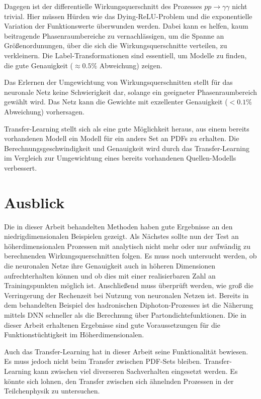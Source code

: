 Dagegen ist der differentielle Wirkungsquerschnitt des Prozesses $pp \rightarrow \gamma \gamma$ nicht trivial. Hier müssen Hürden wie das Dying-ReLU-Problem und die exponentielle Variation der Funktionswerte überwunden werden. Dabei kann es helfen, kaum beitragende Phasenraumbereiche zu vernachlässigen, um die Spanne an Größenordunungen, über die sich die Wirkungsquerschnitte verteilen, zu verkleinern. Die Label-Transformationen sind essentiell, um Modelle zu finden, die gute Genauigkeit ($\approx 0.5\%$ Abweichung) zeigen.

Das Erlernen der Umgewichtung von Wirkungsquerschnitten stellt für das neuronale Netz keine Schwierigkeit dar, solange ein geeigneter Phasenraumbereich gewählt wird. Das Netz kann die Gewichte mit exzellenter Genauigkeit ($<0.1\%$ Abweichung) vorhersagen.

Transfer-Learning stellt sich als eine gute Möglichkeit heraus, aus einem bereits vorhandenen Modell ein Modell für ein anders Set an PDFs zu erhalten. Die Berechnungsgeschwindigkeit und Genauigkeit wird durch das Transfer-Learning im Vergleich zur Umgewichtung eines bereits vorhandenen Quellen-Modells verbessert.

\section{Ausblick}
Die in dieser Arbeit behandelten Methoden haben gute Ergebnisse an den niedrigdimensionalen Beispielen gezeigt. Als Nächstes sollte nun der Test an höherdimensionalen Prozessen mit analytisch nicht mehr oder nur aufwändig zu berechnenden Wirkungsquerschnitten folgen. Es muss noch untersucht werden, ob die neuronalen Netze ihre Genauigkeit auch in höheren Dimensionen aufrechterhalten können und ob dies mit einer realisierbaren Zahl an Trainingspunkten möglich ist. Anschließend muss überprüft werden, wie groß die Verringerung der Rechenzeit bei Nutzung von neuronalen Netzen ist. Bereits in dem behandelten Beispiel des hadronischen Diphoton-Prozesses ist die Näherung mittels DNN schneller als die Berechnung über Partondichtefunktionen. Die in dieser Arbeit erhaltenen Ergebnisse sind gute Voraussetzungen für die Funktionstüchtigkeit im Höherdimensionalen.

Auch das Transfer-Learning hat in dieser Arbeit seine Funktionalität bewiesen. Es muss jedoch nicht beim Transfer zwischen PDF-Sets bleiben. Transfer-Learning kann zwischen viel diverseren Sachverhalten eingesetzt werden. Es könnte sich lohnen, den Transfer zwischen sich ähnelnden Prozessen in der Teilchenphysik zu untersuchen.

